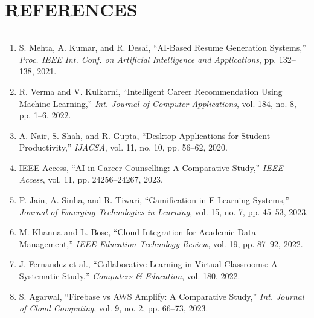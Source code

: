 \documentclass[12,Times new Roman,a4paper]{report}
\begin{document}
\chapter{REFERENCES}
 \rule{\textwidth}{1pt}
 \begin{enumerate}
    \item S. Mehta, A. Kumar, and R. Desai, “AI-Based Resume Generation Systems,” \textit{Proc. IEEE Int. Conf. on Artificial Intelligence and Applications}, pp. 132–138, 2021.
    \vspace{0.2cm}

    \item R. Verma and V. Kulkarni, “Intelligent Career Recommendation Using Machine Learning,” \textit{Int. Journal of Computer Applications}, vol. 184, no. 8, pp. 1–6, 2022.
    \vspace{0.2cm}

    \item A. Nair, S. Shah, and R. Gupta, “Desktop Applications for Student Productivity,” \textit{IJACSA}, vol. 11, no. 10, pp. 56–62, 2020.
    \vspace{0.2cm}

    \item IEEE Access, “AI in Career Counselling: A Comparative Study,” \textit{IEEE Access}, vol. 11, pp. 24256–24267, 2023.
    \vspace{0.2cm}

    \item P. Jain, A. Sinha, and R. Tiwari, “Gamification in E-Learning Systems,” \textit{Journal of Emerging Technologies in Learning}, vol. 15, no. 7, pp. 45–53, 2023.
    \vspace{0.2cm}

    \item M. Khanna and L. Bose, “Cloud Integration for Academic Data Management,” \textit{IEEE Education Technology Review}, vol. 19, pp. 87–92, 2022.
    \vspace{0.2cm}

    \item J. Fernandez et al., “Collaborative Learning in Virtual Classrooms: A Systematic Study,” \textit{Computers \& Education}, vol. 180, 2022.
    \vspace{0.2cm}

    \item S. Agarwal, “Firebase vs AWS Amplify: A Comparative Study,” \textit{Int. Journal of Cloud Computing}, vol. 9, no. 2, pp. 66–73, 2023.
    \vspace{0.2cm}


\end{enumerate}
\end{document}
